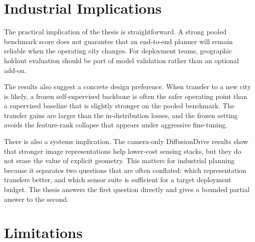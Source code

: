 \section{Industrial Implications}
\label{sec:concl-industrial}

The practical implication of the thesis is straightforward. A strong pooled benchmark score does not guarantee that an end-to-end planner will remain reliable when the operating city changes. For deployment teams, geographic holdout evaluation should be part of model validation rather than an optional add-on.

The results also suggest a concrete design preference. When transfer to a new city is likely, a frozen self-supervised backbone is often the safer operating point than a supervised baseline that is slightly stronger on the pooled benchmark. The transfer gains are larger than the in-distribution losses, and the frozen setting avoids the feature-rank collapse that appears under aggressive fine-tuning.

There is also a systems implication. The camera-only DiffusionDrive results show that stronger image representations help lower-cost sensing stacks, but they do not erase the value of explicit geometry. This matters for industrial planning because it separates two questions that are often conflated: which representation transfers better, and which sensor suite is sufficient for a target deployment budget. The thesis answers the first question directly and gives a bounded partial answer to the second.

\section{Limitations}
\label{sec:concl-limitations}

